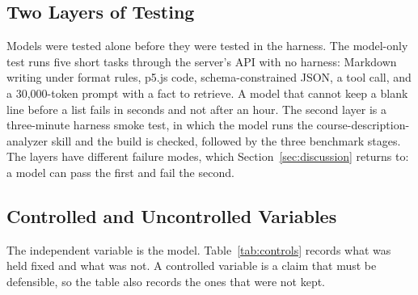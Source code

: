 \subsection{Two Layers of Testing}

Models were tested alone before they were tested in the harness. The model-only test runs five short tasks through the server's API with no harness: Markdown writing under format rules, p5.js code, schema-constrained JSON, a tool call, and a 30,000-token prompt with a fact to retrieve. A model that cannot keep a blank line before a list fails in seconds and not after an hour. The second layer is a three-minute harness smoke test, in which the model runs the course-description-analyzer skill and the build is checked, followed by the three benchmark stages. The layers have different failure modes, which Section~\ref{sec:discussion} returns to: a model can pass the first and fail the second.

\subsection{Controlled and Uncontrolled Variables}

The independent variable is the model. Table~\ref{tab:controls} records what was held fixed and what was not. A controlled variable is a claim that must be defensible, so the table also records the ones that were not kept.

